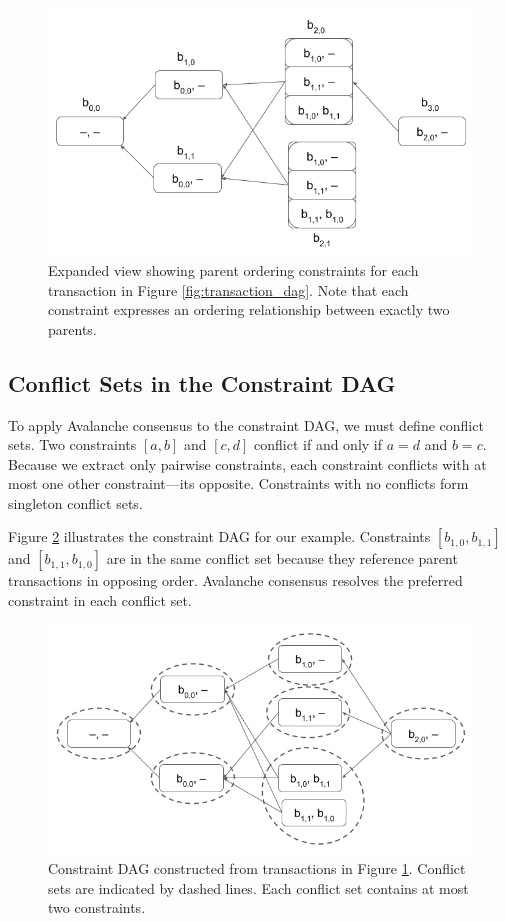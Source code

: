 \documentclass[12pt]{article}
\begin{document}
\begin{figure}
  \centering
  \includegraphics[width=\columnwidth]{images/block_dag_with_constraints.png}
  \caption{Expanded view showing parent ordering constraints for each transaction in Figure \ref{fig:transaction_dag}. Note that each constraint expresses an ordering relationship between exactly two parents.}\label{fig:transaction_dag_with_constraints}
\end{figure}

\subsection{Conflict Sets in the Constraint DAG}
To apply Avalanche consensus to the constraint DAG, we must define conflict
sets. Two constraints $[a, b]$ and $[c, d]$ conflict if and only if $a = d$ and
$b = c$. Because we extract only pairwise constraints, each constraint
conflicts with at most one other constraint—its opposite. Constraints with no
conflicts form singleton conflict sets.

Figure \ref{fig:constraint_dag} illustrates the constraint DAG for our example.
Constraints $[b_{1,0}, b_{1,1}]$ and $[b_{1,1}, b_{1,0}]$ are in the same
conflict set because they reference parent transactions in opposing order.
Avalanche consensus resolves the preferred constraint in each conflict set.

\begin{figure}
  \centering
  \includegraphics[width=\columnwidth]{images/constraint_dag.png}
  \caption{Constraint DAG constructed from transactions in Figure \ref{fig:transaction_dag_with_constraints}. Conflict sets are indicated by dashed lines. Each conflict set contains at most two constraints.}\label{fig:constraint_dag}
\end{figure}
\end{document}
